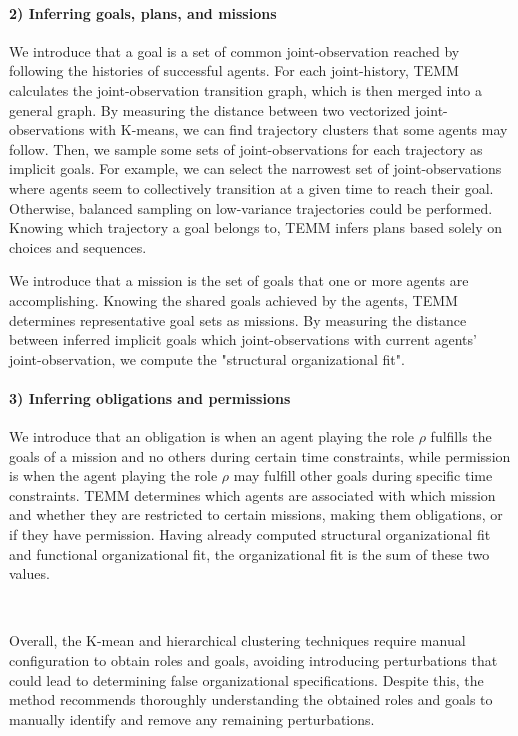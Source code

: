\documentclass[sigconf]{aamas}
\begin{document}
\paragraph{\textbf{2) Inferring goals, plans, and missions}}

We introduce that a goal is a set of common joint-observation reached by following the histories of successful agents.
For each joint-history, TEMM calculates the joint-observation transition graph, which is then merged into a general graph. By measuring the distance between two vectorized joint-observations with K-means, we can find trajectory clusters that some agents may follow. Then, we sample some sets of joint-observations for each trajectory as implicit goals. For example, we can select the narrowest set of joint-observations where agents seem to collectively transition at a given time to reach their goal. Otherwise, balanced sampling on low-variance trajectories could be performed. Knowing which trajectory a goal belongs to, TEMM infers plans based solely on choices and sequences.

We introduce that a mission is the set of goals that one or more agents are accomplishing.
Knowing the shared goals achieved by the agents, TEMM determines representative goal sets as missions.
By measuring the distance between inferred implicit goals which joint-observations with current agents' joint-observation, we compute the "structural organizational fit".

\paragraph{\textbf{3) Inferring obligations and permissions}}

We introduce that an obligation is when an agent playing the role $\rho$ fulfills the goals of a mission and no others during certain time constraints, while permission is when the agent playing the role $\rho$ may fulfill other goals during specific time constraints.
TEMM determines which agents are associated with which mission and whether they are restricted to certain missions, making them obligations, or if they have permission.
Having already computed structural organizational fit and functional organizational fit, the organizational fit is the sum of these two values.

\

Overall, the K-mean and hierarchical clustering techniques require manual configuration to obtain roles and goals, avoiding introducing perturbations that could lead to determining false organizational specifications. Despite this, the method recommends thoroughly understanding the obtained roles and goals to manually identify and remove any remaining perturbations.
\end{document}
